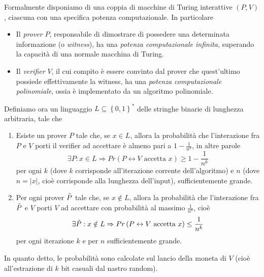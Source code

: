 \documentclass{article}
\theoremstyle{definition}
\begin{document}
Formalmente disponiamo di una coppia di macchine di Turing interattive $(P, V)$, ciascuna con una specifica potenza computazionale. In particolare 
\begin{itemize}
    \item Il \emph{prover} $P$, responsabile di dimostrare di possedere una determinata informazione (o \emph{witness}), ha una \emph{potenza computazionale infinita}, superando la capacità di una normale macchina di Turing.
    \item Il \emph{verifier} $V$, il cui compito è essere convinto dal prover che quest'ultimo possiede effettivamente la witness, ha una \emph{potenza computazionale polinomiale}, ossia è implementato da un algoritmo polinomiale.
\end{itemize}
Definiamo ora un linguaggio $L \subseteq \left\{ 0,1 \right\}^*$ delle stringhe binarie di lunghezza arbitraria, tale che
\begin{enumerate}
    \item Esiste un prover $P$ tale che, se $x \in L$, allora la probabilità che l'interazione fra $P$ e $V$ porti il verifier ad accettare è almeno pari a $1 - \frac{1}{n^k}$, in altre parole
    \begin{equation*}
        \exists P : x \in L \Rightarrow Pr\left(P \leftrightarrow V\text{ accetta } x\right) \geq 1 - \frac{1}{n^k} 
    \end{equation*}
    per ogni $k$ (dove $k$ corrisponde all'iterazione corrente dell'algoritmo) e $n$ (dove $n = |x|$, cioè corrisponde alla lunghezza dell'input), sufficientemente grande.
    \item Per ogni prover $\Tilde{P}$ tale che, se $x \notin L$, allora la probabilità che l'interazione fra $\Tilde{P}$ e $V$ porti $V$ ad accettare con probabilità al massimo $\frac{1}{n^k}$, cioè
    \begin{equation*}
        \exists \Tilde{P} : x \notin L \Rightarrow Pr\left(P \leftrightarrow V\text{ accetta } x\right) \leq \frac{1}{n^k} 
    \end{equation*}
    per ogni iterazione $k$ e per $n$ sufficientemente grande.
\end{enumerate}
In quanto detto, le probabilità sono calcolate sul lancio della moneta di $V$ (cioè all'estrazione di $k$ bit casuali dal nastro random).
\end{document}
